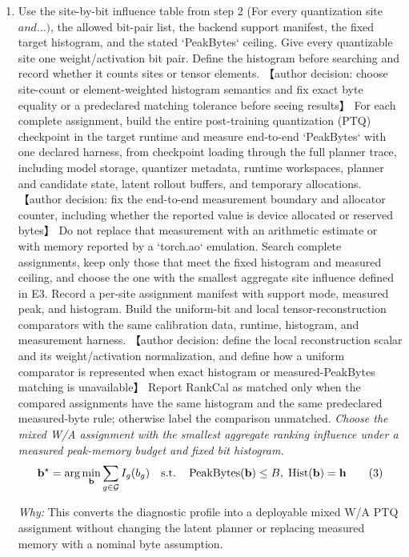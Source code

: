 \documentclass[10pt,a4paper]{article}
\begin{document}
\begin{enumerate}[leftmargin=*,start=2]
  \item Use the site-by-bit influence table from step 2 (For every quantization site \(and\dots )\), the allowed bit-pair list, the backend support manifest, the fixed target histogram, and the stated `PeakBytes` ceiling. Give every quantizable site one weight/activation bit pair. Define the histogram before searching and record whether it counts sites or tensor elements. 【author decision: choose site-count or element-weighted histogram semantics and fix exact byte equality or a predeclared matching tolerance before seeing results】 For each complete assignment, build the entire post-training quantization (PTQ) checkpoint in the target runtime and measure end-to-end `PeakBytes` with one declared harness, from checkpoint loading through the full planner trace, including model storage, quantizer metadata, runtime workspaces, planner and candidate state, latent rollout buffers, and temporary allocations. 【author decision: fix the end-to-end measurement boundary and allocator counter, including whether the reported value is device allocated or reserved bytes】 Do not replace that measurement with an arithmetic estimate or with memory reported by a `torch.ao` emulation. Search complete assignments, keep only those that meet the fixed histogram and measured ceiling, and choose the one with the smallest aggregate site influence defined in E3. Record a per-site assignment manifest with support mode, measured peak, and histogram. Build the uniform-bit and local tensor-reconstruction comparators with the same calibration data, runtime, histogram, and measurement harness. 【author decision: define the local reconstruction scalar and its weight/activation normalization, and define how a uniform comparator is represented when exact histogram or measured-PeakBytes matching is unavailable】 Report RankCal as matched only when the compared assignments have the same histogram and the same predeclared measured-byte rule;\allowbreak{} otherwise label the comparison unmatched.
\noindent\emph{Choose the mixed W/A assignment with the smallest aggregate ranking influence under a measured peak-memory budget and fixed bit histogram.}
\begin{equation}
\resizebox{\ifdim\width>\linewidth \linewidth\else\width\fi}{!}{$\displaystyle \mathbf{b}^{\star}=\arg\min_{\mathbf{b}}\sum_{g\in\mathcal{G}}I_g(b_g)\quad\text{s.t.}\quad\operatorname{PeakBytes}(\mathbf{b})\le B,\;\operatorname{Hist}(\mathbf{b})=\mathbf{h}$} \tag{3}
\end{equation}
\par\emph{Why:} This converts the diagnostic profile into a deployable mixed W/A PTQ assignment without changing the latent planner or replacing measured memory with a nominal byte assumption.
\end{enumerate}
\end{document}
